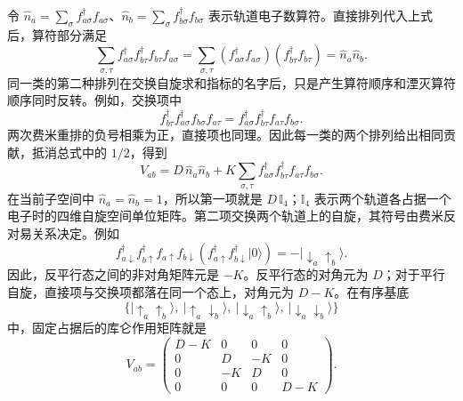 \documentclass[UTF8,11pt,a4paper,fontset=fandol]{ctexart}
\newcommand{\ket}[1]{\lvert #1\rangle}
\newcommand{\id}{\mathbb I}
\begin{document}
令 $\hat n_a=\sum_\sigma f^\dagger_{a\sigma}f_{a\sigma}$、$\hat n_b=\sum_\sigma f^\dagger_{b\sigma}f_{b\sigma}$ 表示轨道电子数算符。直接排列代入上式后，算符部分满足
\begin{equation}
\sum_{\sigma,\tau}
f^\dagger_{a\sigma}f^\dagger_{b\tau}f_{b\tau}f_{a\sigma}
=\sum_{\sigma,\tau}
(f^\dagger_{a\sigma}f_{a\sigma})
(f^\dagger_{b\tau}f_{b\tau})
=\hat n_a\hat n_b.
\end{equation}
同一类的第二种排列在交换自旋求和指标的名字后，只是产生算符顺序和湮灭算符顺序同时反转。例如，交换项中
\begin{equation}
f^\dagger_{b\tau}f^\dagger_{a\sigma}f_{b\sigma}f_{a\tau}
=f^\dagger_{a\sigma}f^\dagger_{b\tau}f_{a\tau}f_{b\sigma}.
\end{equation}
两次费米重排的负号相乘为正，直接项也同理。因此每一类的两个排列给出相同贡献，抵消总式中的 $1/2$，得到
\begin{equation}
V_{ab}=D\,\hat n_a\hat n_b+
K\sum_{\sigma,\tau}
f^\dagger_{a\sigma}f^\dagger_{b\tau}f_{a\tau}f_{b\sigma}.
\label{eq:projectedCoulomb}
\end{equation}
在当前子空间中 $\hat n_a=\hat n_b=1$，所以第一项就是 $D\,\id_4$；$\id_4$ 表示两个轨道各占据一个电子时的四维自旋空间单位矩阵。第二项交换两个轨道上的自旋，其符号由费米反对易关系决定。例如
\begin{equation}
f^\dagger_{a\downarrow}f^\dagger_{b\uparrow}
f_{a\uparrow}f_{b\downarrow}
\left(f^\dagger_{a\uparrow}f^\dagger_{b\downarrow}\ket{0}\right)
=-\ket{\downarrow_a\uparrow_b}.
\end{equation}
因此，反平行态之间的非对角矩阵元是 $-K$。反平行态的对角元为 $D$；对于平行自旋，直接项与交换项都落在同一个态上，对角元为 $D-K$。在有序基底
\begin{equation}
\bigl\{
\ket{\uparrow_a\uparrow_b},\
\ket{\uparrow_a\downarrow_b},\
\ket{\downarrow_a\uparrow_b},\
\ket{\downarrow_a\downarrow_b}
\bigr\}
\label{eq:pairbasis}
\end{equation}
中，固定占据后的库仑作用矩阵就是
\begin{equation}
V_{ab}=
\begin{pmatrix}
D-K&0&0&0\\
0&D&-K&0\\
0&-K&D&0\\
0&0&0&D-K
\end{pmatrix}.
\label{eq:coulombmatrix}
\end{equation}
\end{document}
